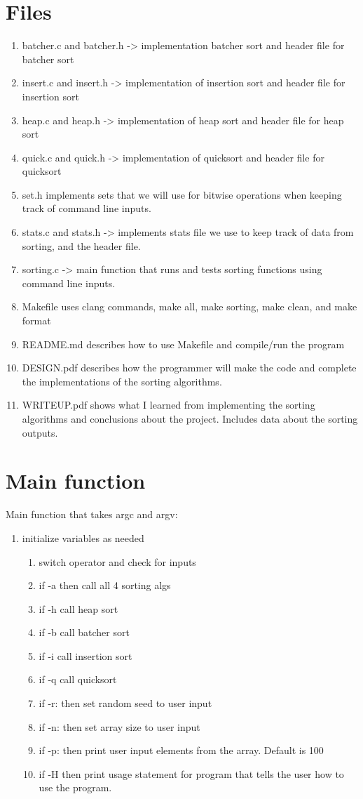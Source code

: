 \documentclass[11pt]{article}
\begin{document}
\section{Files}\label{ss:files}
\begin{enumerate}
\item batcher.c and batcher.h -> implementation batcher sort and header file for batcher sort
\item insert.c and insert.h -> implementation of insertion sort and header file for insertion sort
\item heap.c and heap.h -> implementation of heap sort and header file for heap sort
\item quick.c and quick.h -> implementation of quicksort and header file for quicksort
\item set.h implements sets that we will use for bitwise operations when keeping track of command line inputs.
\item stats.c and stats.h -> implements stats file we use to keep track of data from sorting, and the header file.
\item sorting.c -> main function that runs and tests sorting functions using command line inputs.
\item Makefile uses clang commands, make all, make sorting, make clean, and make format
\item README.md describes how to use Makefile and compile/run the program
\item DESIGN.pdf describes how the programmer will make the code and complete the implementations of the sorting algorithms.
\item WRITEUP.pdf shows what I learned from implementing the sorting algorithms and conclusions about the project. Includes data about the sorting outputs.
\end{enumerate}
\section{Main function}\label{ss:main}
Main function that takes argc and argv:
\begin{enumerate}
\item initialize variables as needed
	\begin{enumerate}
	\item switch operator and check for inputs
	\item if -a then call all 4 sorting algs
	\item if -h call heap sort
	\item if -b call batcher sort
	\item if -i call insertion sort
	\item if -q call quicksort
	\item if -r: then set random seed to user input
	\item if -n: then set array size to user input
	\item if -p: then print user input elements from the array. Default is 100
	\item if -H then print usage statement for program that tells the user how to use the program.
	\end{enumerate}
\end{enumerate}
\end{document}
